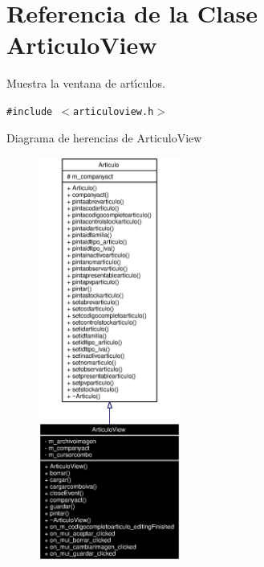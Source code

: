 \section{Referencia de la Clase Articulo\-View}
\label{classArticuloView}
Muestra la ventana de art\'{\i}culos.  


{\tt \#include $<$articuloview.h$>$}

Diagrama de herencias de Articulo\-View\begin{figure}[H]
\begin{center}
\leavevmode
\includegraphics[width=133pt]{classArticuloView__inherit__graph}
\end{center}
\end{figure}
